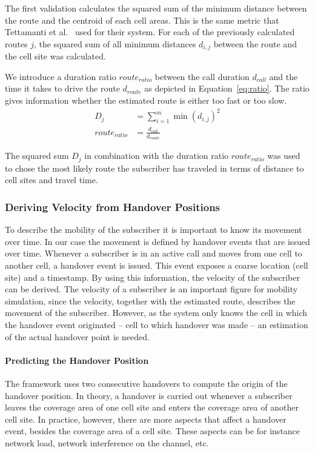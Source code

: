 The first validation calculates the squared sum of the minimum distance between the route and the centroid of each cell areas. This is the same metric that Tettamanti et al.~\cite{Tettamanti2012} used for their system. For each of the previously calculated routes $j$, the squared sum of all minimum distances $d_{i,j}$ between the
route and the cell site was calculated.

We introduce a duration ratio $route_{ratio}$ between the call duration $d_{call}$ and the time it takes to drive the route $d_{route}$ as depicted in Equation~\ref{eq:ratio}. The ratio gives information whether the estimated route is either too fast or too slow. 
\begin{align}
	D_j           & =\sum_{i=1}^{m} \min(d_{i,j})^{2} \label{eq:sumsquaremine} \\
	route_{ratio} & =\frac{d_{call}}{d_{route}} \label{eq:ratio}               
\end{align} 

The squared sum $D_j$ in combination with the duration ratio $route_{ratio}$ was used to chose the most likely route the subscriber has traveled in terms of distance to cell sites and travel time.
\subsubsection{Deriving Velocity from Handover Positions}
To describe the mobility of the subscriber it is important to know its movement over time. In our case the movement is defined by handover events that are issued over time. Whenever a subscriber is in an active call and moves from one cell to another cell, a handover event is issued. This event exposes a coarse location (cell site) and a timestamp. By using this information, the velocity of the subscriber can be derived. The velocity of a subscriber is an important figure for mobility simulation, since the velocity, together with the estimated route, describes the movement of the subscriber. However, as the system only knows the cell in which the handover event originated -- cell to which handover was made -- an estimation of the actual handover point is needed.
\paragraph{Predicting the Handover Position}
The framework uses two consecutive handovers to compute the origin of the handover position. In theory, a handover is carried out whenever a subscriber leaves the coverage area of one cell site and enters the coverage area of another cell site. In practice, however, there are more aspects that affect a handover event, besides the coverage area of a cell site. These aspects can be for instance network load, network interference on the channel, etc.

